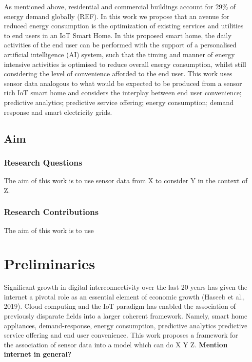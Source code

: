 \documentclass[11pt,]{article}
\begin{document}
As mentioned above, residential and commercial buildings account for
29\% of energy demand globally (REF). In this work we propose that an
avenue for reduced energy consumption is the optimization of existing
services and utilities to end users in an IoT Smart Home. In this
proposed smart home, the daily activities of the end user can be
performed with the support of a personalised artificial intelligence
(AI) system, such that the timing and manner of energy intensive
activities is optimised to reduce overall energy consumption, whilst
still considering the level of convenience afforded to the end user.
This work uses sensor data analogous to what would be expected to be
produced from a sensor rich IoT smart home and considers the interplay
between end user convenience; predictive analytics; predictive service
offering; energy consumption; demand response and smart electricity
grids.

\hypertarget{aim}{%
\subsection{Aim}\label{aim}}

\hypertarget{research-questions}{%
\subsubsection{Research Questions}\label{research-questions}}

The aim of this work is to use sensor data from X to consider Y in the
context of Z.

\hypertarget{research-contributions}{%
\subsubsection{Research Contributions}\label{research-contributions}}

The aim of this work is to use

\pagebreak

\hypertarget{preliminaries}{%
\section{Preliminaries}\label{preliminaries}}

Significant growth in digital interconnectivity over the last 20 years
has given the internet a pivotal role as an essential element of
economic growth (Haseeb et al., 2019). Cloud computing and the IoT
paradigm has enabled the association of previously disparate fields into
a larger coherent framework. Namely, smart home appliances,
demand-response, energy consumption, predictive analytics predictive
service offering and end user convenience. This work proposes a
framework for the association of sensor data into a model which can do X
Y Z. \textbf{Mention internet in general?}
\end{document}
